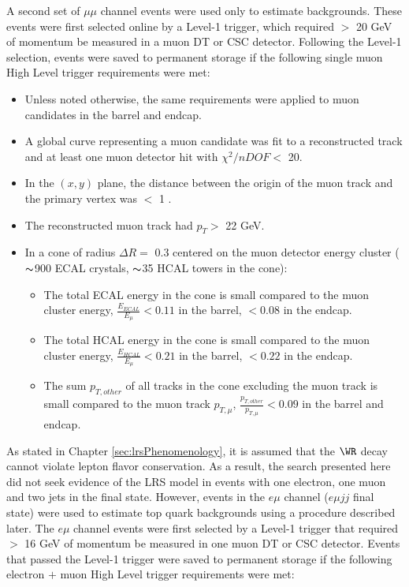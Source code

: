 A second set of $\mu\mu$ channel events were used only to estimate backgrounds.  These events were first 
selected online by a Level-1 trigger, which required $>$ 20 GeV of momentum be measured in a muon 
DT or CSC detector.  Following the Level-1 selection, events were saved to permanent storage if the 
following single muon High Level trigger requirements were met:

\begin{itemize}
	\item Unless noted otherwise, the same requirements were applied to muon candidates in the barrel and endcap.
	\item A global curve representing a muon candidate was fit to a reconstructed track and at least one muon detector hit with $\chi^{2}/nDOF <$ 20.
	\item In the $(x,y)$ plane, the distance between the origin of the muon track and the primary vertex was $<$ 1 \mm.
	\item The reconstructed muon track had $p_{T} >$ 22 GeV.
	\item In a cone of radius $\Delta R =$ 0.3 centered on the muon detector energy cluster ($\thicksim$900 ECAL crystals, $\thicksim$35 HCAL towers in the cone):
	\begin{itemize}
		\item The total ECAL energy in the cone is small compared to the muon cluster energy, $\frac{E_{ECAL}}{E_{\mu}} < 0.11$ in the barrel, $< 0.08$ in the endcap.
		\item The total HCAL energy in the cone is small compared to the muon cluster energy, $\frac{E_{HCAL}}{E_{\mu}} < 0.21$ in the barrel, $< 0.22$ in the endcap.
		\item The sum $p_{T,other}$ of all tracks in the cone excluding the muon track is small compared to the muon track $p_{T,\mu}$, 
			$\frac{p_{T,other}}{p_{T,\mu}} < 0.09$ in the barrel and endcap.
	\end{itemize}
\end{itemize}


As stated in Chapter \ref{sec:lrsPhenomenology}, it is assumed that the $\WR$ decay cannot violate lepton 
flavor conservation.  As a result, the search presented here did not seek evidence of the LRS model in 
events with one electron, one muon and two jets in the final state.  However, events in the $e\mu$ channel 
($e\mu jj$ final state) were used to estimate top quark backgrounds using a procedure described later.  The $e\mu$ 
channel events were first selected by a Level-1 trigger that required $>$ 16 GeV of momentum be 
measured in one muon DT or CSC detector.  Events that passed the Level-1 trigger were saved to permanent 
storage if the following electron $+$ muon High Level trigger requirements were met:

